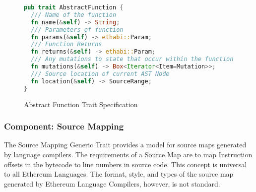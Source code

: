 \documentclass{report}
\begin{document}
\begin{figure}[!h]
    \begin{lstlisting}[language=Rust,basicstyle=\footnotesize]
pub trait AbstractFunction {
  /// Name of the function
  fn name(&self) -> String;
  /// Parameters of function
  fn params(&self) -> ethabi::Param;
  /// Function Returns
  fn returns(&self) -> ethabi::Param;
  /// Any mutations to state that occur within the function
  fn mutations(&self) -> Box<Iterator<Item=Mutation>>;
  /// Source location of current AST Node
  fn location(&self) -> SourceRange;
}
    \end{lstlisting}
    \caption{Abstract Function Trait Specification}
\end{figure}

\newpage
	\subsubsection{Component: Source Mapping}
		The Source Mapping Generic Trait provides a model for source maps generated by language compilers. The requirements of a Source Map are to map Instruction offsets in the bytecode to line numbers in source code. This concept is universal to all Ethereum Languages. The format, style, and types of the source map generated by Ethereum Language Compilers, however, is not standard.
\end{document}
